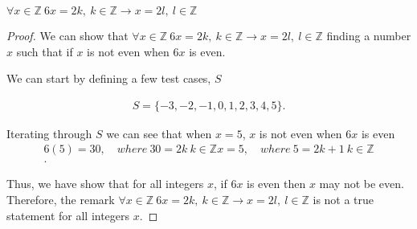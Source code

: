\documentclass{report}
\begin{document}
    \bigbreak \noindent 
    \begin{remark}
       $\forall x \in \mathbb{Z}\ 6x = 2k,\ k\in \mathbb{Z} \rightarrow x = 2l,\ l \in \mathbb{Z}$ 
    \end{remark}
    \bigbreak \noindent 
    \begin{proof}
       We can show that $\forall x \in \mathbb{Z}\ 6x = 2k,\ k\in \mathbb{Z} \rightarrow x = 2l,\ l \in \mathbb{Z}$ finding a number $x$ such that if $x$ is not even when $6x$ is even.
       \bigbreak \noindent 

       We can start by defining a few test cases, $S$

       \begin{align*}
           S = \{-3,-2,-1,0,1,2,3,4,5\}
       .\end{align*}
       \bigbreak \noindent 

       Iterating through $S$ we can see that when $x=5$, $x$ is not even when $6x$ is even
       \begin{align*}
           6(5) = 30,\quad where\ 30 = 2k\ k \in \mathbb{Z}
           x = 5,\quad where\ 5 = 2k+1\ k \in \mathbb{Z} \\
       .\end{align*}
       \bigbreak \noindent 

       Thus, we have show that for all integers $x$, if $6x$ is even then $x$ may not be even. Therefore, the remark $\forall x \in \mathbb{Z}\ 6x = 2k,\ k\in \mathbb{Z} \rightarrow x = 2l,\ l \in \mathbb{Z}$ is not a true statement for all integers $x$.
       \bigbreak \noindent 
       \ep
    \end{proof}

    
    
    
    
    
    
    
    
    



    
    

    

    










    
    
\end{document}
